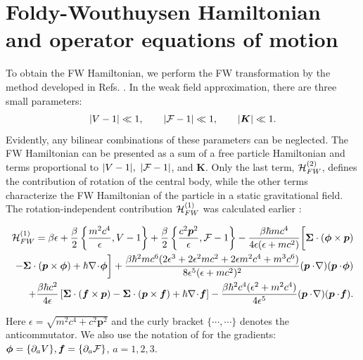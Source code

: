 \documentclass[preprint,showpacs,preprintnumbers,amsmath,amssymb]{revtex4}
\begin{document}
\section{Foldy-Wouthuysen Hamiltonian and operator equations of motion}
\label{FW}

To obtain the FW Hamiltonian, we perform the FW transformation by
the method developed in Refs. \cite{JMP,PRA}. In the weak field
approximation, there are three small parameters:
\begin{equation}
|V-1|\ll 1,\qquad |{\cal F}-1|\ll 1,\qquad |\bm K|\ll 1.
\end{equation}
Evidently, any bilinear combinations of these parameters can be
neglected. The FW Hamiltonian can be presented as a sum of a free
particle Hamiltonian and terms proportional to $|V-1|,~|{\cal
F}-1|$, and $\bm K$. Only the last term, ${\cal H}_{FW}^{(2)}$,
defines the contribution of rotation of the central body, while
the other terms characterize the FW Hamiltonian of the particle in
a static gravitational field. The rotation-independent contribution
${\cal H}_{FW}^{(1)}$ was calculated earlier \cite{PRD}:
\begin{widetext}
\begin{eqnarray}
{\cal H}_{FW}^{(1)}=\beta\epsilon + \frac{\beta}{2}\left\{
\frac{m^2c^4}{\epsilon },V-1\right\} + \frac{\beta}{2}\left\{
\frac{c^2\bm p^2}{\epsilon },{\cal F}-1\right\}-\frac{\beta
\hbar mc^4}{4 \epsilon (\epsilon + mc^2)}\biggl[\bm{\Sigma}
\cdot(\bm\phi\times\bm p)\nonumber\\
- \bm{\Sigma}\cdot(\bm p\times\bm\phi)+ \hbar\nabla\!
\cdot\!\bm\phi\biggr] + \frac{\beta \hbar^2 mc^6(2\epsilon^3
+ 2\epsilon ^2mc^2 + 2\epsilon m^2c^4+m^3c^6)}{8\epsilon^5
(\epsilon +mc^2)^2}(\bm p\cdot\!\nabla)(\bm p\cdot\!\bm\phi)
\nonumber\\
+ \frac{\beta\hbar c^2}{4\epsilon }\left[\bm{\Sigma}\cdot
(\bm f\times\bm p) - \bm{\Sigma}\cdot(\bm p\times\bm f)+\hbar
\nabla\! \cdot\!\bm f\right]-\frac{\beta \hbar^2 c^4(\epsilon^2
+m^2c^4)}{4\epsilon^5}(\bm p\cdot\!\nabla)(\bm p\cdot\!\bm f).
\label{eq7}
\end{eqnarray}
\end{widetext}
Here $\epsilon=\sqrt{m^2c^4+c^2\bm p^2}$ and the curly bracket
$\{\cdots,\cdots\}$ denotes the anticommutator. We also use the
notation of \cite{Ob1,PRD} for the gradients: ${\bm \phi} =
\{\partial_a V\}, {\bm f} = \{\partial_a {\cal F}\}$, $a = 1,2,3$.
\end{document}
